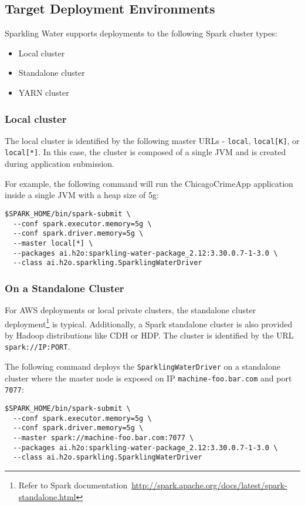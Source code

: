 \subsection{Target Deployment Environments}
Sparkling Water supports deployments to the following Spark cluster types:
\begin{itemize}
	\item{Local cluster}
	\item{Standalone cluster} 
	\item{YARN cluster}
\end{itemize}

\subsubsection{Local cluster}
The local cluster is identified by the following master URLs - \texttt{local}, \texttt{local[K]}, or \texttt{local[*]}. In this
case, the cluster is composed of a single JVM and is created during application submission.

For example, the following command will run the ChicagoCrimeApp application inside a single JVM with a heap size of 5g:
\begin{lstlisting}[style=Bash]
$SPARK_HOME/bin/spark-submit \ 
  --conf spark.executor.memory=5g \
  --conf spark.driver.memory=5g \
  --master local[*] \
  --packages ai.h2o:sparkling-water-package_2.12:3.30.0.7-1-3.0 \
  --class ai.h2o.sparkling.SparklingWaterDriver
\end{lstlisting}

\subsubsection{On a Standalone Cluster}
For AWS deployments or local private clusters, the standalone cluster
deployment\footnote{Refer to Spark documentation~\url{http://spark.apache.org/docs/latest/spark-standalone.html}} is
typical. Additionally, a Spark standalone cluster is also provided by Hadoop distributions like CDH or HDP. The cluster is
identified by the URL \texttt{spark://IP:PORT}.

The following command deploys the \texttt{SparklingWaterDriver} on a standalone cluster where the master node
is exposed on IP \texttt{machine-foo.bar.com} and port \texttt{7077}:

\begin{lstlisting}[style=Bash]
$SPARK_HOME/bin/spark-submit \ 
  --conf spark.executor.memory=5g \
  --conf spark.driver.memory=5g \
  --master spark://machine-foo.bar.com:7077 \
  --packages ai.h2o:sparkling-water-package_2.12:3.30.0.7-1-3.0 \
  --class ai.h2o.sparkling.SparklingWaterDriver
\end{lstlisting}

